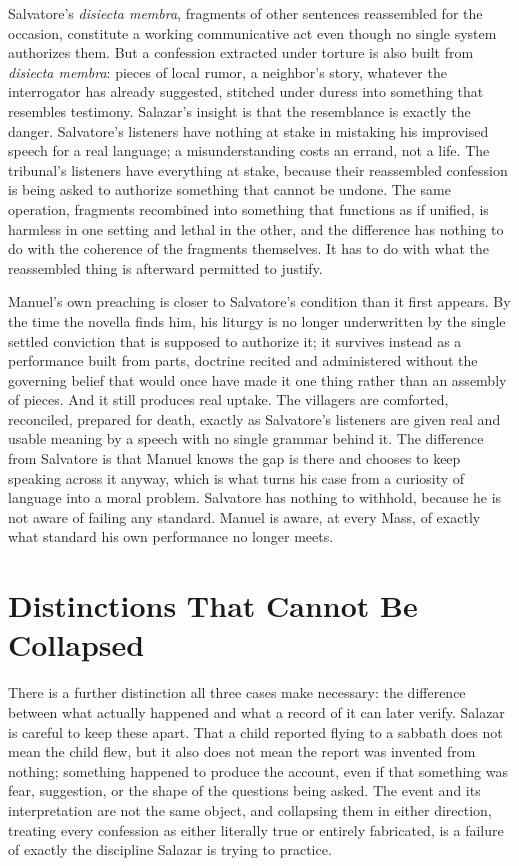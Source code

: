 \documentclass[12pt]{article}
\begin{document}
Salvatore's \textit{disiecta membra}, fragments of other sentences reassembled for the occasion, constitute a working communicative act even though no single system authorizes them. But a confession extracted under torture is also built from \textit{disiecta membra}: pieces of local rumor, a neighbor's story, whatever the interrogator has already suggested, stitched under duress into something that resembles testimony. Salazar's insight is that the resemblance is exactly the danger. Salvatore's listeners have nothing at stake in mistaking his improvised speech for a real language; a misunderstanding costs an errand, not a life. The tribunal's listeners have everything at stake, because their reassembled confession is being asked to authorize something that cannot be undone. The same operation, fragments recombined into something that functions as if unified, is harmless in one setting and lethal in the other, and the difference has nothing to do with the coherence of the fragments themselves. It has to do with what the reassembled thing is afterward permitted to justify.

Manuel's own preaching is closer to Salvatore's condition than it first appears. By the time the novella finds him, his liturgy is no longer underwritten by the single settled conviction that is supposed to authorize it; it survives instead as a performance built from parts, doctrine recited and administered without the governing belief that would once have made it one thing rather than an assembly of pieces. And it still produces real uptake. The villagers are comforted, reconciled, prepared for death, exactly as Salvatore's listeners are given real and usable meaning by a speech with no single grammar behind it. The difference from Salvatore is that Manuel knows the gap is there and chooses to keep speaking across it anyway, which is what turns his case from a curiosity of language into a moral problem. Salvatore has nothing to withhold, because he is not aware of failing any standard. Manuel is aware, at every Mass, of exactly what standard his own performance no longer meets.

\section*{Distinctions That Cannot Be Collapsed}

There is a further distinction all three cases make necessary: the difference between what actually happened and what a record of it can later verify. Salazar is careful to keep these apart. That a child reported flying to a sabbath does not mean the child flew, but it also does not mean the report was invented from nothing; something happened to produce the account, even if that something was fear, suggestion, or the shape of the questions being asked. The event and its interpretation are not the same object, and collapsing them in either direction, treating every confession as either literally true or entirely fabricated, is a failure of exactly the discipline Salazar is trying to practice. 
\end{document}
